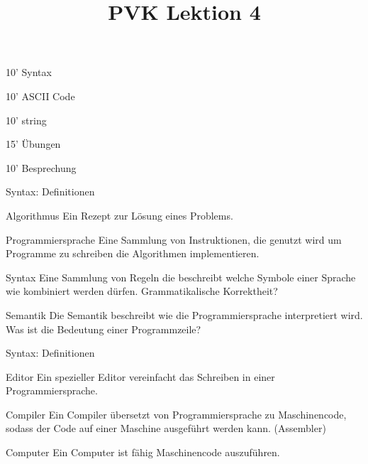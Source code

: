 \ifnum\conditionmacro=1 \documentclass[handout,usenames,dvipsnames]{beamer}\fi
\begin{document}
\title{PVK Lektion 4}

\maketitle

\begin{TFTimeSchedule}
\item 10' Syntax
\item 10' ASCII Code
\item 10' string
\item 15' Übungen
\item 10' Besprechung
\end{TFTimeSchedule}

\begin{frame}{Syntax: Definitionen}
\begin{block}{Algorithmus}
Ein Rezept zur Lösung eines Problems.
\end{block}

\begin{block}{Programmiersprache}
Eine Sammlung von Instruktionen, die genutzt wird um Programme zu schreiben die Algorithmen implementieren.
\end{block}

\begin{block}{Syntax}
Eine Sammlung von Regeln die beschreibt welche Symbole einer Sprache wie kombiniert werden dürfen. Grammatikalische Korrektheit?
\end{block}

\begin{block}{Semantik}
Die Semantik beschreibt wie die Programmiersprache interpretiert wird. Was ist die Bedeutung einer Programmzeile?
\end{block}
\end{frame}

\begin{frame}{Syntax: Definitionen}

\begin{block}{Editor}
Ein spezieller Editor vereinfacht das Schreiben in einer Programmiersprache.
\end{block}

\begin{block}{Compiler}
Ein Compiler übersetzt von Programmiersprache zu Maschinencode, sodass der Code auf einer Maschine ausgeführt werden kann. (Assembler)
\end{block}

\begin{block}{Computer}
Ein Computer ist fähig Maschinencode auszuführen.
\end{block}

\end{frame}
\end{document}
